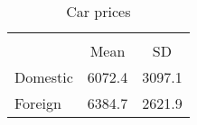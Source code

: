 \documentclass{article}
\begin{document}
        \blindtext

    \begin{table}[b]\centering
            \caption{Car prices}
        \begin{tabular}{l*{1}{cc}}
            \hline
            &\multicolumn{2}{c}{}     \\
            &        Mean&          SD\\
            \hline
            Domestic    &      6072.4&      3097.1\\

            Foreign     &      6384.7&      2621.9\\
            \hline
        \end{tabular}
    \end{table}
    
        \blindtext
\end{document}
